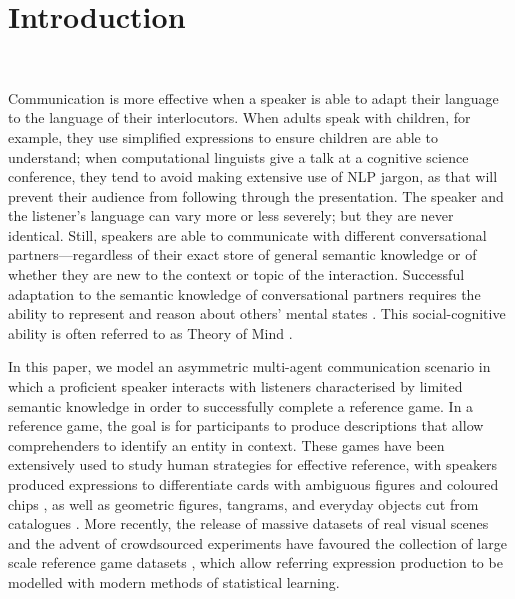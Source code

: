 
\section{Introduction}
\label{sec:intro}

\\

Communication is more effective when a speaker is able to adapt their language to the language of their interlocutors. When adults speak with children, for example, they use simplified expressions to ensure children are able to understand; when computational linguists give a talk at a cognitive science conference, they tend to avoid making extensive use of NLP jargon, as that will prevent their audience from following through the presentation.
The speaker and the listener's language can vary more or less severely; but they are never identical.
Still, speakers are able to communicate with different conversational partners---regardless of their exact store of general semantic knowledge or of whether they are new to the context or topic of the interaction.
Successful adaptation to the semantic knowledge of conversational partners requires the ability to represent and reason about others’ mental states \cite{tomasello2005constructing}. This social-cognitive ability is often referred to as Theory of Mind \cite[ToM;][]{premack1978tom}. 

In this paper, we model an asymmetric multi-agent communication scenario in which a proficient speaker interacts with listeners characterised by limited semantic knowledge in order to successfully complete a reference game.
In a reference game, the goal is for participants to produce descriptions that allow comprehenders to identify an entity in context. These games have been extensively used to study human strategies for effective reference, with speakers produced expressions to differentiate cards with ambiguous figures and coloured chips \cite{krauss1964changes,krauss1967effect}, as well as geometric figures, tangrams, and everyday objects cut from catalogues \citep{ClarkWilkes-Gibbs1986,BrennanClark1996}. More recently, the release of massive datasets of real visual scenes and the advent of crowdsourced experiments have favoured the collection of large scale reference game datasets \citep{shore-etal-2018-kth,haber2019photobook}, which allow referring expression production to be modelled with modern methods of statistical learning. 

